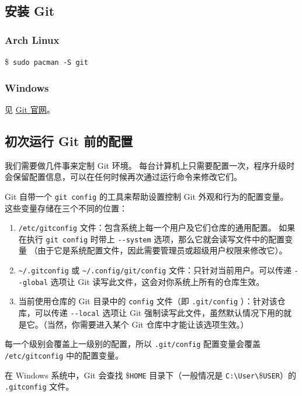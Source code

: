 \documentclass{ctexart}
\def\mydollar{{\fontspec{Consolas}\$\ }}%
\begin{document}
\subsection{安装 Git}
\subsubsection{Arch Linux}
    \begin{mybox}{}
        \mydollar \texttt{sudo pacman -S git}
    \end{mybox}

\subsubsection{Windows}
    见 \href{https://git-scm.com/}{Git 官网}。

\subsection{初次运行 Git 前的配置}
    我们需要做几件事来定制 Git 环境。
    每台计算机上只需要配置一次，程序升级时会保留配置信息，可以在任何时候再次通过运行命令来修改它们。

    Git 自带一个 \verb|git config| 的工具来帮助设置控制 Git 外观和行为的配置变量。
    这些变量存储在三个不同的位置：

\begin{enumerate}[labelindent=\parindent, leftmargin=*, align=left]
    \item \verb|/etc/gitconfig| 文件：包含系统上每一个用户及它们仓库的通用配置。
          如果在执行 \verb|git config| 时带上 \verb|--system| 选项，那么它就会读写文件中的配置变量
          （由于它是系统配置文件，因此需要管理员或超级用户权限来修改它）。
    \item \verb|~/.gitconfig| 或 \verb|~/.config/git/config| 文件：只针对当前用户。可以传递 \verb|--global| 选项让 Git 读写此文件，这会对你系统上所有的仓库生效。
    \item 当前使用仓库的 Git 目录中的 \verb|config| 文件（即 \verb|.git/config| ）：针对该仓库，可以传递 \verb|--local| 选项让 Git 强制读写此文件，虽然默认情况下用的就是它。（当然，你需要进入某个 Git 仓库中才能让该选项生效。）
\end{enumerate}

    每一个级别会覆盖上一级别的配置，所以 \verb|.git/config| 配置变量会覆盖 \verb|/etc/gitconfig| 中的配置变量。

    在 Windows 系统中，Git 会查找 {\$}\verb|HOME| 目录下（一般情况是 \verb|C:\User\|{\$}\verb|USER|）的 \verb|.gitconfig| 文件。
\end{document}
